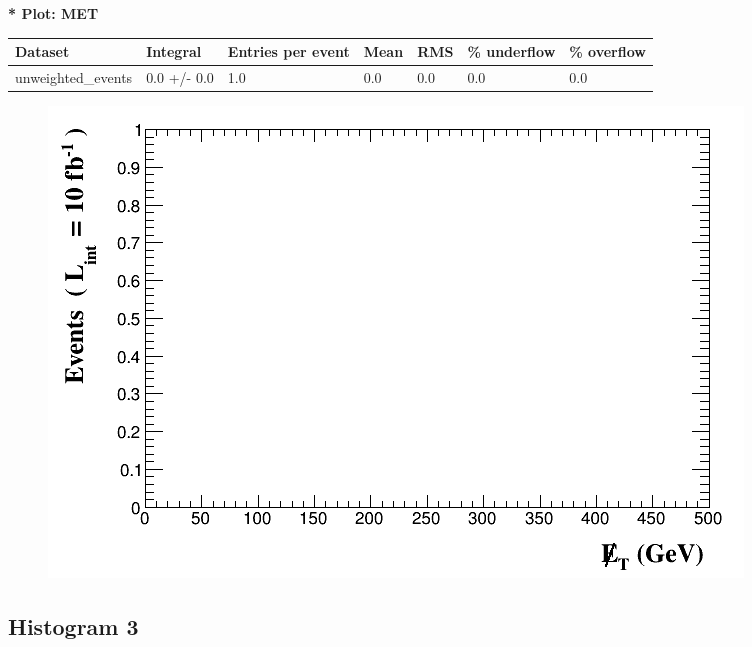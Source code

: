 \documentclass[a4paper, 10pt]{article}
\begin{document}
\textbf{* Plot: MET}\\
   \begin{table}[H]
  \begin{center}
    \begin{tabular}{|m{23.0mm}|m{23.0mm}|m{18.0mm}|m{19.0mm}|m{19.0mm}|m{19.0mm}|m{19.0mm}|}
      \hline
      {\cellcolor{yellow}         Dataset}& {\cellcolor{yellow}         Integral}& {\cellcolor{yellow}         Entries per event}& {\cellcolor{yellow}         Mean}& {\cellcolor{yellow}         RMS}& {\cellcolor{yellow}         \% underflow}& {\cellcolor{yellow}         \% overflow}\\
      \hline
      {\cellcolor{white}         unweighted\_events}& {\cellcolor{white}         0.0 +/\-- 0.0}& {\cellcolor{white}         1.0}& {\cellcolor{white}         0.0}& {\cellcolor{white}         0.0}& {\cellcolor{green}         0.0}& {\cellcolor{green}         0.0}\\
\hline
    \end{tabular}
  \end{center}
\end{table}

\begin{figure}[H]
  \begin{center}
    \includegraphics[scale=0.45]{selection_1.png}\\
\caption{   }
  \end{center}
\end{figure}
      \newpage
\subsection{ Histogram 3}
\end{document}
